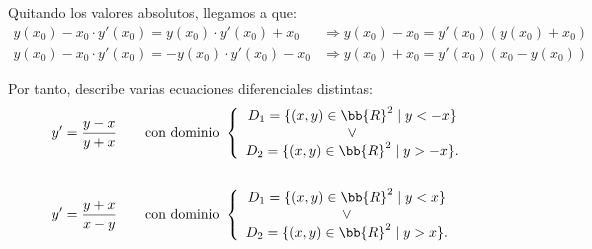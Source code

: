 \begin{ejercicio}
\begin{enumerate}
        Quitando los valores absolutos, llegamos a que:
        \begin{align*}
            y(x_0) - x_0\cdot y'(x_0) = y(x_0)\cdot y'(x_0) + x_0
            &\Longrightarrow y(x_0) - x_0 = y'(x_0)\left( y(x_0) + x_0 \right)\\
            y(x_0) - x_0\cdot y'(x_0) = -y(x_0)\cdot y'(x_0) - x_0
            &\Longrightarrow y(x_0) + x_0 = y'(x_0)\left( x_0 -y(x_0)\right)
        \end{align*}

        Por tanto, describe varias ecuaciones diferenciales distintas:
        \begin{align*}
            y' &= \dfrac{y - x}{y + x} \qquad \text{con dominio } \left\{\begin{array}{c}
                D_1=\{(x, y)\in \bb{R}^2 \mid y<-x\}\\
                \lor \\
                D_2=\{(x, y)\in \bb{R}^2 \mid y>-x\}.\\
            \end{array}\right. \\ \\
            y' &= \dfrac{y+x}{x-y} \qquad \text{con dominio } \left\{\begin{array}{c}
                D_1=\{(x, y)\in \bb{R}^2 \mid y<x\}\\
                \lor \\
                D_2=\{(x, y)\in \bb{R}^2 \mid y>x\}.\\
            \end{array}\right.
        \end{align*}

    \end{enumerate}
\end{ejercicio}


